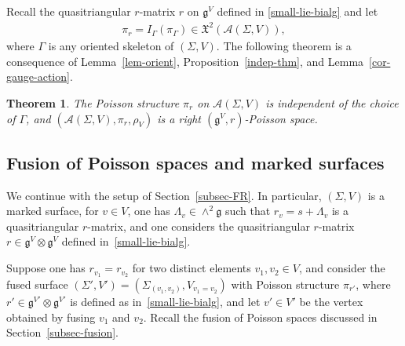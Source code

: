 \documentclass[pdftex]{sigma}
\numberwithin{equation}{section}
\newtheorem{Theorem}{Theorem}[section]
\newcommand{\XX}{\mathfrak{X}}
\def \g {\mathfrak{a}}
\def \g {\mathfrak{g}}
\def \A {{\mathcal{A}}}
\def \sV {{\scriptscriptstyle V}}
\def \sGam {{\scriptscriptstyle \Gamma}}
\begin{document}
Recall the quasitriangular $r$-matrix $r$ on $\g^{\sV}$ def\/ined in \eqref{small-lie-bialg} and let
\begin{gather*}
\pi_r = I_\Gamma(\pi_{\sGam}) \in \XX^2(\A(\Sigma, V)),
\end{gather*}
where $\Gamma$ is any oriented skeleton of $(\Sigma, V)$. The following theorem is a consequence of Lemma~\ref{lem-orient}, Proposition~\ref{indep-thm}, and Lemma~\ref{cor-gauge-action}.

\begin{Theorem} \label{main-thm-2}The Poisson structure $\pi_r$ on $\A(\Sigma, V)$ is independent of the choice of $\Gamma$, and $(\A(\Sigma, V), \pi_r, \rho_{\sV})$ is a right $(\g^{\sV}, r)$-Poisson space.
\end{Theorem}

\subsection{Fusion of Poisson spaces and marked surfaces} \label{subsec-fus}

We continue with the setup of Section~\ref{subsec-FR}. In particular, $(\Sigma, V)$ is a marked surface, for $v \in V$, one has $\Lambda_v \in \wedge^2 \g$ such that $r_v = s + \Lambda_v$ is a quasitriangular $r$-matrix, and one considers the quasitriangular $r$-matrix $r \in \g^{\sV} \otimes \g^{\sV}$ def\/ined in~\eqref{small-lie-bialg}.

Suppose one has $r_{v_1} = r_{v_2}$ for two distinct elements $v_1, v_2 \in V$, and consider the fused surface $(\Sigma', V') = (\Sigma_{(v_1, v_2)}, V_{v_1 = v_2})$ with Poisson structure $\pi_{r'}$, where $r' \in \g^{\sV'} \otimes \g^{\sV'}$ is def\/ined as in~\eqref{small-lie-bialg}, and let $v' \in V'$ be the vertex obtained by fusing $v_1$ and $v_2$. Recall the fusion of Poisson spaces discussed in Section~\ref{subsec-fusion}.
\end{document}
